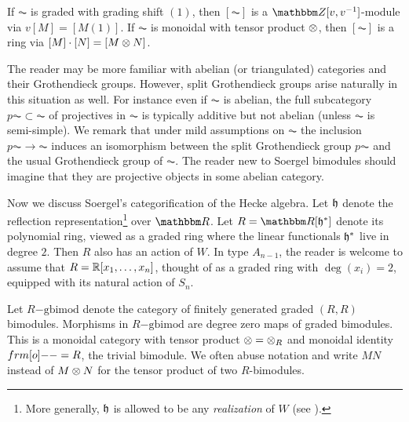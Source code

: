 If $\AC$ is graded with grading shift $(1)$, then $[\AC]$ is a $\Z[v,v\inv]$-module via $v[M] = [M(1)]$. If $\AC$ is monoidal with tensor product $\otimes$, then $[\AC]$ is a ring via
$[M]\cdot [N] = [M \otimes N]$.

\begin{remark} The reader may be more familiar with abelian (or triangulated) categories and their Grothendieck groups.  However, split Grothendieck groups arise naturally in this situation as well.  For instance even if $\AC$ is abelian, the full subcategory $p\AC\subset \AC$ of projectives in $\AC$ is typically additive but not abelian (unless $\AC$ is semi-simple).   We remark that under mild assumptions on $\AC$ the inclusion $p\AC\rightarrow \AC$ induces an isomorphism between the split Grothendieck group $p\AC$ and the usual Grothendieck group of $\AC$.  The reader new to Soergel bimodules should imagine that they are projective objects in some abelian category. \end{remark}


Now we discuss Soergel's categorification of the Hecke algebra. Let ${\mathfrak h}$ denote the reflection representation\footnote{More generally, ${\mathfrak h}$ is allowed to be any \emph{realization} of $W$ (see \cite{EWsoergelCalc}).} over $\R$. Let $R=\R[\hg^\ast]$ denote its polynomial ring, viewed as a graded ring where the linear functionals ${\mathfrak h}^*$ live in degree $2$. Then $R$ also has an action of $W$. In type $A_{n-1}$, the reader is welcome to assume that $R = {\mathbb{R}}[x_1, \ldots, x_n]$, thought of as a graded
ring with $\deg(x_i)=2$, equipped with its natural action of $S_n$.

Let $R\mathrm{-gbimod}$ denote the category of finitely generated graded $(R,R)$ bimodules. Morphisms in $R\mathrm{-gbimod}$ are degree zero maps of graded bimodules. This is a monoidal
category with tensor product $\otimes=\otimes_R$ and monoidal identity $\one=R$, the trivial bimodule. We often abuse notation and write $MN$ instead of $M \otimes N$ for the tensor product of
two $R$-bimodules.

